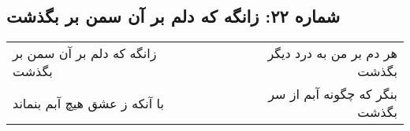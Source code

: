 \begin{center}
\section*{شماره ۲۲: زانگه که دلم بر آن سمن بر بگذشت}
\label{sec:022}
\begin{longtable}{l p{0.5cm} r}
زانگه که دلم بر آن سمن بر بگذشت
&&
هر دم بر من به درد دیگر بگذشت
\\
با آنکه ز عشق هیچ آبم بنماند
&&
بنگر که چگونه آبم از سر بگذشت
\\
\end{longtable}
\end{center}
